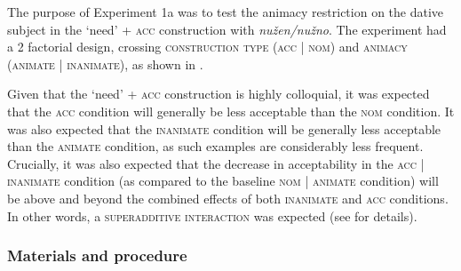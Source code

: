 \documentclass[output=paper,colorlinks,citecolor=brown]{langscibook}
\begin{document}
The purpose of Experiment 1a was to test the animacy restriction on the dative subject in the `need' + \textsc{acc} construction with \textit{nužen/nužno}. The experiment had a 2 factorial design, crossing \textsc{construction type} (\textsc{acc} | \textsc{nom}) and \textsc{animacy} (\textsc{animate} | \textsc{inanimate}), as shown in .

\ea \label{exp1-materials}
\z\z

\noindent Given that the `need' + \textsc{acc} construction is highly colloquial, it was expected that the \textsc{acc} condition will generally be less acceptable than the \textsc{nom} condition. It was also expected that the \textsc{inanimate} condition will be generally less acceptable than the \textsc{animate} condition, as such examples are considerably less frequent. Crucially, it was also expected that the decrease in acceptability in the \textsc{acc} | \textsc{inanimate} condition (as compared to the baseline \textsc{nom} | \textsc{animate} condition) will be above and beyond the combined effects of both \textsc{inanimate} and \textsc{acc} conditions. In other words, a \textsc{superadditive interaction} was expected (see \citealt{Sprouse.Wagers.Phillips2012} for details).

\subsubsection{Materials and procedure}
\end{document}
